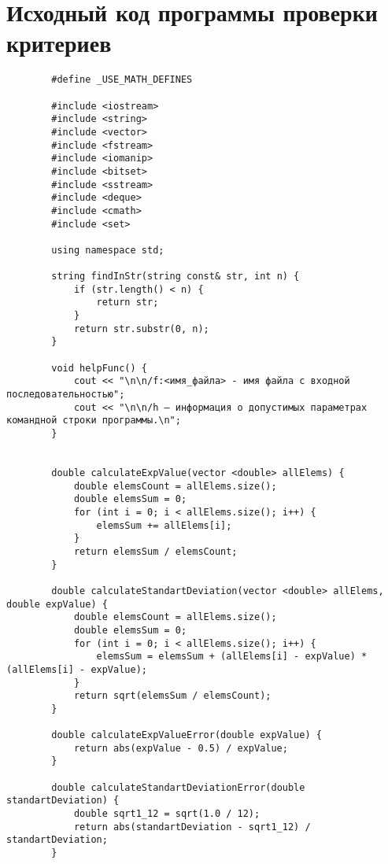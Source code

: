 \documentclass[bachelor, och, coursework]{shiza}
\begin{document}
	
	\newpage
	\appendix
	\section{Исходный код программы проверки критериев}
	
	\begin{verbatim}
		#define _USE_MATH_DEFINES
		
		#include <iostream>
		#include <string>
		#include <vector>
		#include <fstream>
		#include <iomanip>
		#include <bitset>
		#include <sstream>
		#include <deque>
		#include <cmath>
		#include <set>
		
		using namespace std;
		
		string findInStr(string const& str, int n) {
			if (str.length() < n) {
				return str;
			}
			return str.substr(0, n);
		}
		
		void helpFunc() {
			cout << "\n\n/f:<имя_файла> - имя файла с входной последовательностью";
			cout << "\n\n/h – информация о допустимых параметрах командной строки программы.\n";
		}
		
		
		double calculateExpValue(vector <double> allElems) {
			double elemsCount = allElems.size();
			double elemsSum = 0;
			for (int i = 0; i < allElems.size(); i++) {
				elemsSum += allElems[i];
			}
			return elemsSum / elemsCount;
		}
		
		double calculateStandartDeviation(vector <double> allElems, double expValue) {
			double elemsCount = allElems.size();
			double elemsSum = 0;
			for (int i = 0; i < allElems.size(); i++) {
				elemsSum = elemsSum + (allElems[i] - expValue) * (allElems[i] - expValue);
			}
			return sqrt(elemsSum / elemsCount);
		}
		
		double calculateExpValueError(double expValue) {
			return abs(expValue - 0.5) / expValue;
		}
		
		double calculateStandartDeviationError(double standartDeviation) {
			double sqrt1_12 = sqrt(1.0 / 12);
			return abs(standartDeviation - sqrt1_12) / standartDeviation;
		}
		

\end{verbatim}
\end{document}
